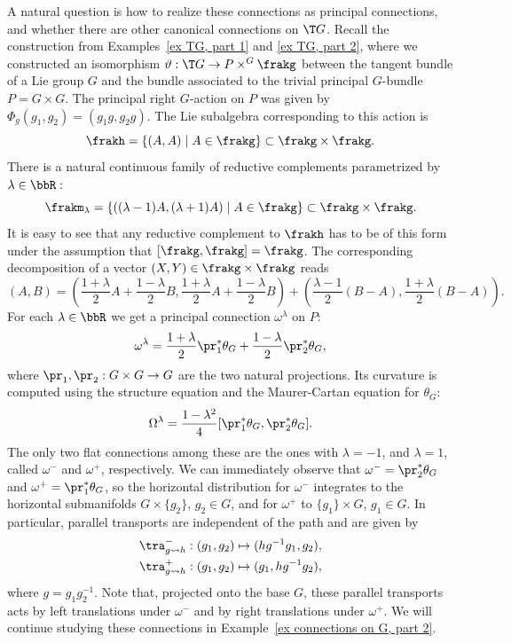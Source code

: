 \begin{example}
    A natural question is how to realize these connections as principal connections, and whether there are other canonical connections on $\T G$. Recall the construction from Examples~\ref{ex TG, part 1} and \ref{ex TG, part 2}, where we constructed an isomorphism $\vartheta:\T G\to P\times^G \frakg$ between the tangent bundle of a Lie group $G$ and the bundle associated to the trivial principal $G$-bundle $P=G\times G$. The principal right $G$-action on $P$ was given by $\Phi_g(g_1,g_2)=(g_1g,g_2g)$. The Lie subalgebra corresponding to this action is
    \[\frakh=\{(A,A)\mid A\in\frakg\}\subset  \frakg\times\frakg.\]
    There is a natural continuous family of reductive complements parametrized by $\lambda\in\bbR:$
    \[\frakm_\lambda=\{((\lambda-1)A,(\lambda+1)A)\mid A\in\frakg\}\subset  \frakg\times\frakg.\] 
    It is easy to see that any reductive complement to $\frakh$ has to be of this form under the assumption that $[\frakg,\frakg]=\frakg$. The corresponding decomposition of a vector $(X,Y)\in\frakg\times\frakg$ reads
    \[(A,B)=\left(\frac{1+\lambda}{2}A+\frac{1-\lambda}{2}B,\frac{1+\lambda}{2}A+\frac{1-\lambda}{2}B\right)+\left(\frac{\lambda-1}{2}(B-A),\frac{1+\lambda}{2}(B-A)\right).\]
    For each $\lambda\in\bbR$ we get a principal connection $\omega^\lambda$ on $P$:
    \[\omega^\lambda=\frac{1+\lambda}{2}\pr_1^\ast \theta_G+\frac{1-\lambda}{2}\pr_2^\ast \theta_G,\]
    where $\pr_1,\pr_2:G\times G\to G$ are the two natural projections. Its curvature is computed using the structure equation and the Maurer-Cartan equation for $\theta_G$:
    \[\Omega^\lambda=\frac{1-\lambda^2}{4}[\pr_1^\ast \theta_G,\pr_2^\ast\theta_G].\]
    The only two flat connections among these are the ones with $\lambda=-1$, and $\lambda=1$, called $\omega^-$ and $\omega^+$, respectively. We can immediately observe that $\omega^-=\pr_2^\ast\theta_G$ and $\omega^+=\pr_1^\ast\theta_G$, so the horizontal distribution for $\omega^-$ integrates to the horizontal submanifolds $G\times\{g_2\}$, $g_2\in G$, and for $\omega^+$ to $\{g_1\}\times G$, $g_1\in G$. In particular, parallel transports are independent of the path and are given by
    \begin{align}
        \tra^-_{g\leadsto h}: (g_1,g_2)\mapsto (hg^{-1}g_1,g_2),\\
        \tra^+_{g\leadsto h}: (g_1,g_2)\mapsto (g_1,hg^{-1}g_2),
    \end{align}
    where $g=g_1g_2^{-1}$. Note that, projected onto the base $G$, these parallel transports acts by left translations under $\omega^-$ and by right translations under $\omega^+$.
    We will continue studying these connections in Example~\ref{ex connections on G, part 2}.
\end{example}









